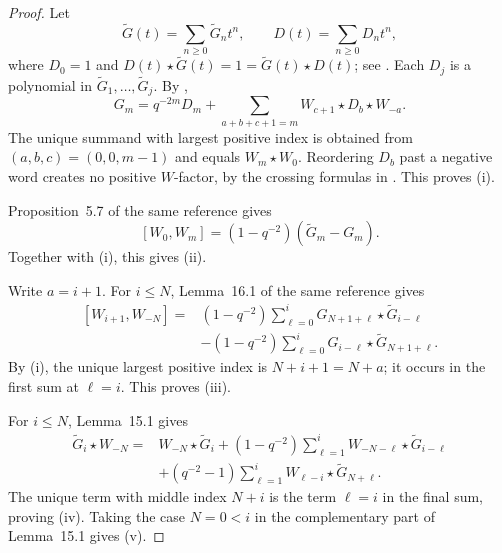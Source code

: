 \documentclass[11pt]{extarticle}
\theoremstyle{definition}
\theoremstyle{remark}
\numberwithin{equation}{section}
\begin{document}
\begin{proof}
Let
\[
 \widetilde G(t)=\sum_{n\geq0}\widetilde G_nt^n,
 \qquad D(t)=\sum_{n\geq0}D_nt^n,
\]
where $D_0=1$ and
$D(t)\star\widetilde G(t)=1=\widetilde G(t)\star D(t)$; see
\cite[Definition~9.5, Definition~9.11, and Lemma~9.12]
{Terwilliger2019Alternating}.  Each $D_j$ is a polynomial in
$\widetilde G_1,\ldots,\widetilde G_j$.  By
\cite[Theorem~9.15, equation~(70)]{Terwilliger2019Alternating},
\begin{equation}
\label{eq:G-D-expansion}
 G_m=q^{-2m}D_m+
 \sum_{a+b+c+1=m}W_{c+1}\star D_b\star W_{-a}.
\end{equation}
The unique summand with largest positive index is obtained from
$(a,b,c)=(0,0,m-1)$ and equals $W_m\star W_0$.  Reordering $D_b$ past a
negative word creates no positive $W$-factor, by the crossing formulas in
\cite[Lemma~15.1]{Terwilliger2019Alternating}.  This proves (i).

Proposition~5.7 of the same reference gives
\[
 [W_0,W_m]=(1-q^{-2})(\widetilde G_m-G_m).
\]
Together with (i), this gives (ii).

Write $a=i+1$.  For $i\leq N$, Lemma~16.1 of the same reference gives
\begin{equation}
\label{eq:exact-W-large-crossing}
 \begin{split}
 [W_{i+1},W_{-N}]
 ={}&(1-q^{-2})\sum_{\ell=0}^{i}
       G_{N+1+\ell}\star\widetilde G_{i-\ell}\\
 &-(1-q^{-2})\sum_{\ell=0}^{i}
       G_{i-\ell}\star\widetilde G_{N+1+\ell}.
 \end{split}
\end{equation}
By (i), the unique largest positive index is $N+i+1=N+a$; it occurs in
the first sum at $\ell=i$.  This proves (iii).

For $i\leq N$, Lemma~15.1 gives
\begin{equation}
\label{eq:exact-tG-large-crossing}
 \begin{split}
 \widetilde G_i\star W_{-N}
 ={}&W_{-N}\star\widetilde G_i
 +(1-q^{-2})\sum_{\ell=1}^{i}
   W_{-N-\ell}\star\widetilde G_{i-\ell}\\
 &+(q^{-2}-1)\sum_{\ell=1}^{i}
   W_{\ell-i}\star\widetilde G_{N+\ell}.
 \end{split}
\end{equation}
The unique term with middle index $N+i$ is the term $\ell=i$ in the final
sum, proving (iv).  Taking the case $N=0<i$ in the complementary part of
Lemma~15.1 gives (v).
\end{proof}
\end{document}

